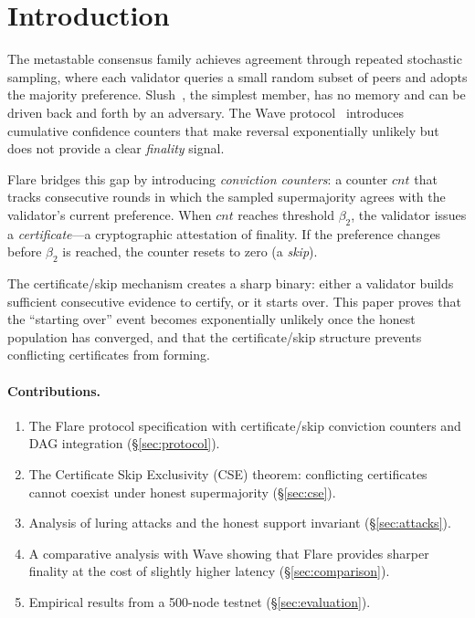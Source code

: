 \section{Introduction}

\label{sec:introduction}

The metastable consensus family achieves agreement through repeated stochastic sampling,
where each validator queries a small random subset of peers and adopts the majority
preference. Slush~\cite{rocket2019wave}, the simplest member, has no memory
and can be driven back and forth by an adversary. The Wave protocol~\cite{kelling2020wave}
introduces cumulative confidence counters that make reversal exponentially unlikely
but does not provide a clear \emph{finality} signal.

Flare bridges this gap by introducing \emph{conviction counters}: a counter $cnt$ that
tracks consecutive rounds in which the sampled supermajority agrees with the validator's
current preference. When $cnt$ reaches threshold $\beta_2$, the validator issues a
\emph{certificate}---a cryptographic attestation of finality. If the preference changes
before $\beta_2$ is reached, the counter resets to zero (a \emph{skip}).

The certificate/skip mechanism creates a sharp binary: either a validator builds sufficient
consecutive evidence to certify, or it starts over. This paper proves that the
``starting over'' event becomes exponentially unlikely once the honest population
has converged, and that the certificate/skip structure prevents conflicting certificates
from forming.

\paragraph{Contributions.}
\begin{enumerate}[nosep]
\item The Flare protocol specification with certificate/skip conviction counters and
DAG integration (\S\ref{sec:protocol}).
\item The Certificate Skip Exclusivity (CSE) theorem: conflicting certificates cannot
coexist under honest supermajority (\S\ref{sec:cse}).
\item Analysis of luring attacks and the honest support invariant (\S\ref{sec:attacks}).
\item A comparative analysis with Wave showing that Flare provides sharper finality
at the cost of slightly higher latency (\S\ref{sec:comparison}).
\item Empirical results from a 500-node testnet (\S\ref{sec:evaluation}).
\end{enumerate}

